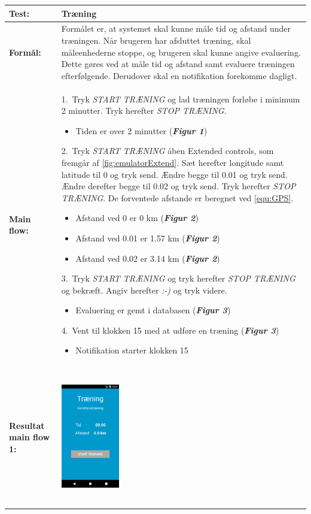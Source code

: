   \begin{longtable}{ | p{2cm} | p{13cm} |} \hline
    \textbf{Test:} & Træning \\ \hline
  \textbf{Formål:} & Formålet er, at systemet skal kunne måle tid og afstand under træningen. Når brugeren har afsluttet træning, skal måleenhederne stoppe, og brugeren skal kunne angive evaluering. Dette gøres ved at måle tid og afstand samt evaluere træningen efterfølgende. Derudover skal en notifikation forekomme dagligt.
 \\ \hline
 	\textbf{Main flow:} & 1.~Tryk \textit{START TRÆNING} og lad træningen forløbe i minimum 2 minutter. Tryk herefter \textit{STOP TRÆNING}.
 	\begin{itemize}
 	\item Tiden er over 2 minutter (\textbf{\textit{Figur 1}})
 	\end{itemize}	
 	2.~Tryk \textit{START TRÆNING} åben Extended controls, som fremgår af \autoref{fig:emulatorExtend}. Sæt herefter longitude samt latitude til 0 og tryk send. Ændre begge til 0.01 og tryk send. Ændre derefter begge til 0.02 og tryk send. Tryk herefter \textit{STOP TRÆNING}. De forventede afstande er beregnet ved \autoref{equ:GPS}. 
 	\begin{itemize}
 	\item Afstand ved 0 er 0 km (\textbf{\textit{Figur 2}})
 	\item Afstand ved 0.01 er 1.57 km (\textbf{\textit{Figur 2}})
 	\item Afstand ved 0.02 er 3.14 km (\textbf{\textit{Figur 2}})
	\end{itemize}
  3.~Tryk \textit{START TRÆNING} og tryk herefter \textit{STOP TRÆNING} og 	bekræft. Angiv herefter \textit{:-)} og tryk videre.
  \begin{itemize}
  \item Evaluering er gemt i databasen (\textbf{\textit{Figur 3}})
  \end{itemize}
   4.~Vent til klokken 15 med at udføre en træning (\textbf{\textit{Figur 3}})
  \begin{itemize}
  \item Notifikation starter klokken 15
  \vspace{1mm}
  \end{itemize}
\\ \hline
\textbf{Resultat main flow 1:} &\hspace{1.5mm}
    \raisebox{-\totalheight}    {\includegraphics[width=0.24\textwidth, height=60mm]{figures/test/traening2}} 

\end{longtable}
